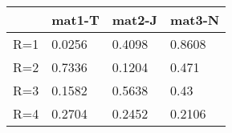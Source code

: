 \begin{tabular}{llll}
& mat1-T & mat2-J & mat3-N \\ 
\hline 
R=1 & 0.0256 & 0.4098 & 0.8608 \\ 
R=2 & 0.7336 & 0.1204 & 0.471 \\ 
R=3 & 0.1582 & 0.5638 & 0.43 \\ 
R=4 & 0.2704 & 0.2452 & 0.2106 \\ 
\hline 
\end{tabular}